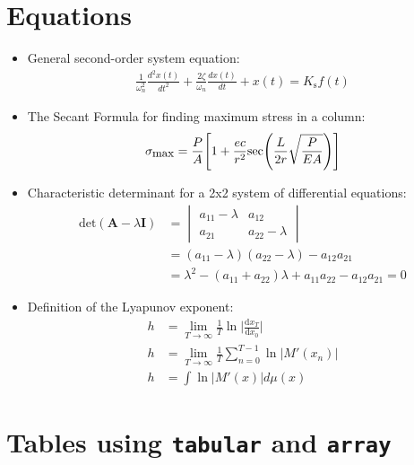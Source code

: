 \documentclass{article}
\begin{document}
\section{Equations} %
\begin{itemize}
\item General second-order system equation\cite[p.~221]{Rizzoni}:
\begin{align*}
\frac{1}{\omega^2_n}\frac{d^2x(t)}{dt^2}+\frac{2\zeta}{\omega_n}\frac{dx(t)}{dt}+x(t)=K_{\mbox{s}}f(t)
\end{align*}
\item The Secant Formula for finding maximum stress 
in a column\cite[p.~681]{Hibbeler}:
\begin{align*}
\sigma_{\mbox{\small{max}}}=\frac{P}{A}\Bigg[1+\frac{ec}{r^2}\mbox{sec}\Bigg(\frac{L}{2r}\sqrt{\frac{P}{EA}}\Bigg)\Bigg]
\end{align*}
\item Characteristic determinant for a 2x2 system of 
differential equations\cite[p.~152]{Kreyszig}:
\begin{align}
\mbox{det}(\boldsymbol{A}-\lambda\boldsymbol{I})&=
\begin{vmatrix}a_{11}-\lambda&a_{12}\\\nonumber
a_{21}&a_{22}-\lambda\end{vmatrix}\\\nonumber
&= (a_{11}-\lambda)(a_{22}-\lambda)-a_{12}a_{21}\\
&= \lambda^2-(a_{11}+a_{22})\lambda+a_{11}a_{22}-a_{12}a_{21}=0
\end{align}
\item Definition of the Lyapunov exponent\cite[p.~56]{Ott}:
\begin{align}
h &= \lim_{T \to \infty}\frac{1}{T}\ln \bigg|\frac{\mbox{d}x_T}{\mbox{d}x_0}\bigg|\\
h &= \lim_{T \to \infty}\frac{1}{T}\sum_{n=0}^{T-1}\ln |M'(x_n)|\\
h &= \int \ln |M'(x)|d\mu(x)
\end{align}
\end{itemize}
\section{Tables using \texttt{tabular} and \texttt{array}}
\end{document}
